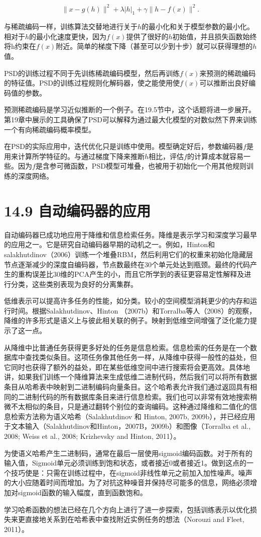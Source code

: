 \begin{equation}
 \| x - g(h) \| ^2 + \lambda | h |_1 + \gamma \| h - f(x) \|^2.
\end{equation}

与稀疏编码一样，训练算法交替地进行关于$h$的最小化和关于模型参数的最小化。相对于$h$的最小化速度更快，因为$f(x)$提供了很好的$h$初始值，并且损失函数始终将h约束在$f(x)$附近。简单的梯度下降（甚至可以少到十步）就可以获得理想的$h$值。

PSD的训练过程不同于先训练稀疏编码模型，然后再训练$f(x)$来预测的稀疏编码的特征值。PSD的训练过程规则化解码器，使之能使用使$f(x)$可以推断出良好编码值的参数。

预测稀疏编码是学习近似推断的一个例子。在19.5节中，这个话题将进一步展开。第19章中展示的工具确保了PSD可以解释为通过最大化模型的对数似然下界来训练一个有向稀疏编码概率模型。

在PSD的实际应用中，迭代优化只是训练中使用。模型确定好后，参数编码器$f$是用来计算所学特征的。与通过梯度下降来推断$h$相比，评估$f$的计算成本就容易一些。因为$f$是含参可微函数，PSD模型可堆叠，也被用于初始化一个用其他规则训练的深度网络。

\section{14.9 自动编码器的应用}
自动编码器已成功地应用于降维和信息检索任务。降维是表示学习和深度学习最早的应用之一。它是研究自动编码器早期的动机之一。例如，Hinton和salakhutdinov（2006）训练一个堆叠RBM，然后利用它们的权重来初始化隐藏层节点逐渐减少的深度自编码器，节点数最终在30个单元处达到瓶颈。最终的代码产生的重构误差比30维的PCA产生的小，而且它所学到的表征更容易定性解释及进行分类，这些类别表现为良好的分离集群。

低维表示可以提高许多任务的性能，如分类。较小的空间模型消耗更少的内存和运行时间。根据Salakhutdinov、Hinton （2007b）和Torralba等人（2008）的观察，降维的许多形式是语义上与彼此相关联的例子。映射到低维空间增强了泛化能力提示了这一点。

从降维中比普通任务获得更多好处的任务是信息检索。信息检索的任务是在一个数据库中查找类似条目。这项任务像其他任务一样，从降维中获得一般性的益处，但它同时也获得了额外的益处，即在某些低维空间中进行搜索将会更高效。具体地讲，如果我们训练一个降维算法来生成低维二进制代码，然后我们可以将所有数据条目从哈希表中映射到二进制编码向量条目。这个哈希表允许我们通过返回具有相同的二进制代码的所有数据库条目来进行信息检索。我们也可以非常有效地搜索稍微不太相似的条目，只是通过翻转个别位的查询编码。这种通过降维和二值化的信息检索方法称为语义哈希（Salakhutdinov 和 Hinton, 2007b, 2009b），并已经应用于文本输入（Salakhutdinov和Hinton，2007B，2009b）和图像（Torralba et al., 2008; Weiss et al., 2008; Krizhevsky and Hinton, 2011）。

为使语义哈希产生二进制码，通常在最后一层使用sigmoid编码函数。对于所有的输入值，Sigmoid单元必须训练到饱和状态，或者接近0或者接近1。做到这点的一个技巧使是：只需在训练过程中，在sigmoid非线性单元之前加入加性噪声。噪声的大小应随着时间而增加。为了对抗这种噪音并保持尽可能多的信息，网络必须增加对sigmoid函数的输入幅度，直到函数饱和。

学习哈希函数的想法已经在几个方向上进行了进一步探索，包括训练表示以优化损失来更直接地关系到在哈希表中查找附近实例任务的想法（Norouzi and Fleet, 2011）。

